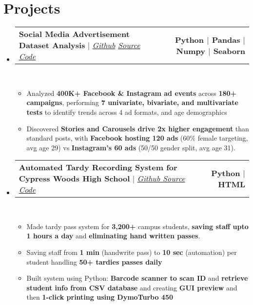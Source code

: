\documentclass[letterpaper,11pt]{article}
\makeatletter
\newcommand{\resumeItem}[1]{
  \item\small{
    {#1 \vspace{0pt}}
  }
}
\newcommand{\resumeProjectHeading}[2]{
    \item
    \begin{tabular*}{1.001\textwidth}{l@{\extracolsep{\fill}}r}
      \small#1 & \textbf{\small #2}\\
    \end{tabular*}\vspace{-7pt}
}
\newcommand{\resumeSubHeadingListStart}{\begin{itemize}[leftmargin=0.0in, label={}]}
\newcommand{\resumeSubHeadingListEnd}{\end{itemize}}\vspace{0pt}
\newcommand{\resumeItemListStart}{\begin{itemize}}
\newcommand{\resumeItemListEnd}{\end{itemize}\vspace{-5pt}}
\makeatother
\begin{document}
\section{Projects} 
    \vspace{-5pt}
    \resumeSubHeadingListStart
    \resumeProjectHeading
            {\textbf{{Social Media Advertisement Dataset Analysis}} $|$ \emph{\href{https://github.com/gupta-bananas/social-media-advertisement-data-analysis-insights}{Github} \href{https://github.com/gupta-bananas/social-media-advertisement-data-analysis-insights}{Source Code}}}{Python $|$ Pandas $|$ Numpy $|$ Seaborn}
            \\[5mm]
          \resumeItemListStart
            \resumeItem{Analyzed \textbf{400K+ Facebook \& Instagram ad events} across \textbf{180+ campaigns}, performing \textbf{7 univariate, bivariate, and multivariate tests }to identify trends across 4 ad formats, and  age demographics}
            \resumeItem{Discovered \textbf{Stories and Carousels drive 2x higher engagement} than standard posts, with \textbf{Facebook hosting 120 ads} (60\% female targeting, avg age 29) vs \textbf{Instagram's 60 ads} (50/50 gender split, avg age 31).}
          \resumeItemListEnd
 \vspace{-22pt}
 \resumeProjectHeading
            {\textbf{{Automated Tardy Recording System for Cypress Woods High School}} $|$ \emph{\href{https://github.com/gupta-bananas/eSchool-Tardy-System}{Github Source Code}}}{Python $|$ HTML}
            \\[5mm]
          \resumeItemListStart
            \resumeItem{Made tardy pass system for \textbf{3,200+ }campus students, \textbf{saving staff upto 1 hours a day} and \textbf{eliminating hand written passes}.}
             \resumeItem{Saving staff from \textbf{1 min} (handwrite pass) to \textbf{10 sec} (automation) per student handling\textbf{ \textbf{50+ tardies passes daily}}}
          \resumeItem{Built system using Python: \textbf{Barcode scanner to scan ID} and \textbf{retrieve student info from CSV database} and creating \textbf{GUI  preview} and then \textbf{1-click printing using DymoTurbo 450}}
          \resumeItemListEnd
\resumeSubHeadingListEnd
\vspace{-15pt}



\end{document}
